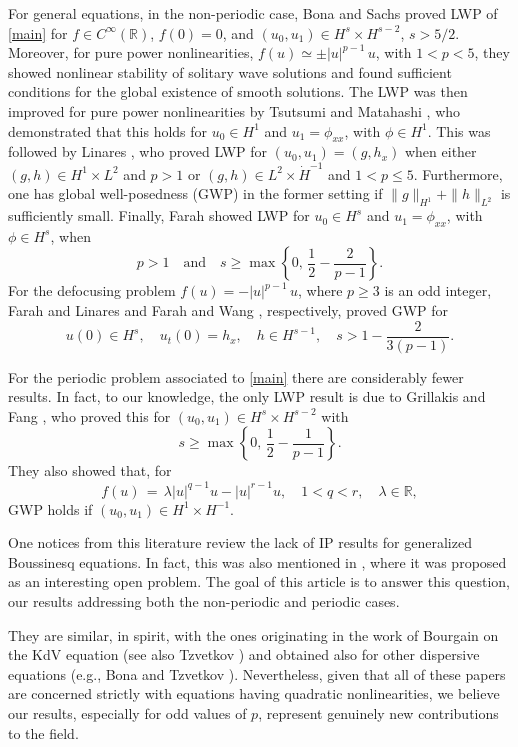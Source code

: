 \documentclass{amsart}
\begin{document}
For general equations, in the non-periodic case, Bona and Sachs \cite{BS} proved LWP of \eqref{main} for $f\in C^\infty(\mathbb{R})$, $f(0)=0$, and $(u_0,u_1)\in H^s \times H^{s-2}$, $s>5/2$. Moreover, for pure power nonlinearities, $f(u)\simeq\pm |u|^{p-1}\,u$, with $1<p<5$, they showed nonlinear stability of solitary wave solutions and found sufficient conditions for the global existence of smooth solutions.  The LWP was then improved for pure power nonlinearities by Tsutsumi and Matahashi \cite{TM}, who demonstrated that this holds for $u_0\in H^1$ and $u_1=\phi_{xx}$, with $\phi\in H^1$. This was followed by Linares \cite{L93}, who proved LWP for $(u_0,u_1)=(g, h_x)$ when either $(g,h) \in H^1\times L^2$ and $p>1$ or $(g,h) \in L^2 \times \dot{H}^{-1}$  and $1<p\leq 5$. Furthermore, one has global well-posedness (GWP) in the former setting if $\|g\|_{H^1}+\|h\|_{L^2}$ is sufficiently small. Finally, Farah \cite{F092} showed LWP for $u_0\in H^s$ and $u_1=\phi_{xx}$, with $\phi\in H^s$, when
\[
p>1 \quad \text{and} \quad s\geq \max \left\{0,\,\frac{1}{2}-\frac{2}{p-1}\right\}. \]
For the defocusing problem $f(u)= -|u|^{p-1}\,u$, where $p\geq 3$ is an odd integer, Farah and Linares \cite{FL} and Farah and Wang \cite{FW12}, respectively, proved GWP for 
\[
u(0)\in H^s, \quad u_t(0)=h_x , \quad h \in H^{s-1}, \quad s> 1-\frac{2}{3(p-1)}.
\]

For the periodic problem associated to \eqref{main} there are considerably fewer results. In fact, to our knowledge, the only LWP result is due to Grillakis and Fang \cite{FG96}, who proved this for $(u_0,u_1)\in H^s \times H^{s-2}$  with 
\[
s\geq \max \left\{0,\,\frac{1}{2}-\frac{1}{p-1}\right\}. \]
They also showed that, for
\[
f(u)\,=\,\lambda |u|^{q-1}u - |u|^{r-1}u, \quad 1<q<r, \quad \lambda\in \mathbb{R},\] 
GWP holds if $(u_0,u_1)\in H^1\times H^{-1}$. 

One notices from this literature review the lack of IP results for generalized Boussinesq equations. In fact, this  was also mentioned in  \cite{FW12}, where it was proposed as an interesting open problem. The goal of this article is to answer this question, our results addressing both the non-periodic and periodic cases. 

They are similar, in spirit, with the ones originating in the work of Bourgain \cite{B97} on the KdV equation (see also Tzvetkov \cite{T99}) and obtained also for other dispersive equations (e.g., Bona and Tzvetkov \cite{BT09}). Nevertheless, given that all of these papers are concerned strictly with equations having quadratic nonlinearities, we believe our results, especially for odd values of $p$, represent genuinely new contributions to the field.  
\end{document}
